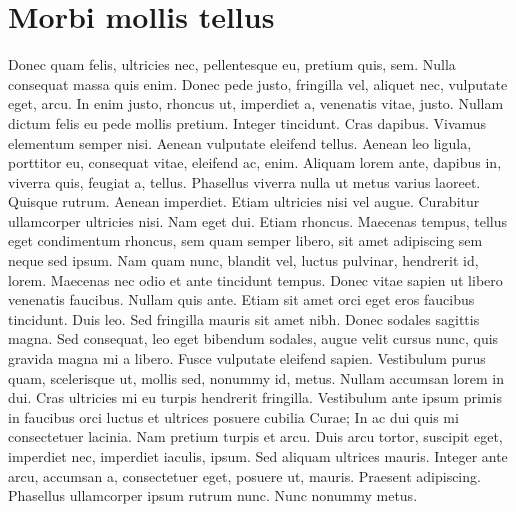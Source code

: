 \section{Morbi mollis tellus}
Donec quam felis, ultricies nec, pellentesque eu, pretium quis, sem. Nulla consequat massa quis enim. Donec pede justo, fringilla vel, aliquet nec, vulputate eget, arcu. In enim justo, rhoncus ut, imperdiet a, venenatis vitae, justo. Nullam dictum felis eu pede mollis pretium. Integer tincidunt. Cras dapibus. Vivamus elementum semper nisi. Aenean vulputate eleifend tellus. Aenean leo ligula, porttitor eu, consequat vitae, eleifend ac, enim. Aliquam lorem ante, dapibus in, viverra quis, feugiat a, tellus. Phasellus viverra nulla ut metus varius laoreet. Quisque rutrum. Aenean imperdiet. Etiam ultricies nisi vel augue. Curabitur ullamcorper ultricies nisi. Nam eget dui. Etiam rhoncus. Maecenas tempus, tellus eget condimentum rhoncus, sem quam semper libero, sit amet adipiscing sem neque sed ipsum. Nam quam nunc, blandit vel, luctus pulvinar, hendrerit id, lorem. Maecenas nec odio et ante tincidunt tempus. Donec vitae sapien ut libero venenatis faucibus. Nullam quis ante. Etiam sit amet orci eget eros faucibus tincidunt. Duis leo. Sed fringilla mauris sit amet nibh. Donec sodales sagittis magna. Sed consequat, leo eget bibendum sodales, augue velit cursus nunc, quis gravida magna mi a libero. Fusce vulputate eleifend sapien. Vestibulum purus quam, scelerisque ut, mollis sed, nonummy id, metus. Nullam accumsan lorem in dui. Cras ultricies mi eu turpis hendrerit fringilla. Vestibulum ante ipsum primis in faucibus orci luctus et ultrices posuere cubilia Curae; In ac dui quis mi consectetuer lacinia. Nam pretium turpis et arcu. Duis arcu tortor, suscipit eget, imperdiet nec, imperdiet iaculis, ipsum. Sed aliquam ultrices mauris. Integer ante arcu, accumsan a, consectetuer eget, posuere ut, mauris. Praesent adipiscing. Phasellus ullamcorper ipsum rutrum nunc. Nunc nonummy metus.

